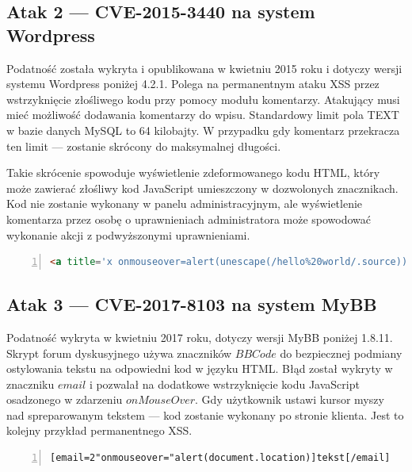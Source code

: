\documentclass[11pt,a4paper,polish,thesis]{dcsbook}
\begin{document}
\subsection*{Atak 2 --- CVE-2015-3440 na system Wordpress}
Podatność została wykryta i opublikowana w kwietniu 2015 roku i dotyczy wersji systemu Wordpress poniżej 4.2.1. Polega na permanentnym ataku XSS przez wstrzyknięcie złośliwego kodu przy pomocy modułu komentarzy. Atakujący musi mieć możliwość dodawania komentarzy do wpisu. Standardowy limit pola TEXT w bazie danych MySQL to 64 kilobajty. W przypadku gdy komentarz przekracza ten limit --- zostanie skrócony do maksymalnej długości. 

Takie skrócenie spowoduje wyświetlenie zdeformowanego kodu HTML, który może zawierać złośliwy kod JavaScript umieszczony w dozwolonych znacznikach. Kod nie zostanie wykonany w panelu administracyjnym, ale wyświetlenie komentarza przez osobę o uprawnieniach administratora może spowodować wykonanie akcji z podwyższonymi uprawnieniami.


\begin{lstlisting}[language=HTML,frame=single,label=testkod2,numbers=left,caption=komentarz wykorzystujący podatność CVE-2015-3440 zamieszczony przez autora]
<a title='x onmouseover=alert(unescape(/hello%20world/.source)) style=position:absolute;left:0;top:0;width:5000px;height:5000px  AAAAAAAAAAAA...[64 kb]..AAA'></a>
\end{lstlisting}


\subsection*{Atak 3 --- CVE-2017-8103 na system MyBB}
Podatność wykryta w kwietniu 2017 roku, dotyczy wersji MyBB poniżej 1.8.11. Skrypt forum dyskusyjnego używa znaczników $BBCode$ do bezpiecznej podmiany ostylowania tekstu na odpowiedni kod w języku HTML. Błąd został wykryty w znaczniku $email$ i pozwalał na dodatkowe wstrzyknięcie kodu JavaScript osadzonego w zdarzeniu $onMouseOver$. Gdy użytkownik ustawi kursor myszy nad spreparowanym tekstem --- kod zostanie wykonany po stronie klienta. Jest to kolejny przykład permanentnego XSS.

\begin{lstlisting}[language=HTML,frame=single,label=testkod3,numbers=left,caption=znacznik wykorzystujący podatność CVE-2017-8103 zamieszczony przez autora]
[email=2"onmouseover="alert(document.location)]tekst[/email]
\end{lstlisting}
\end{document}
